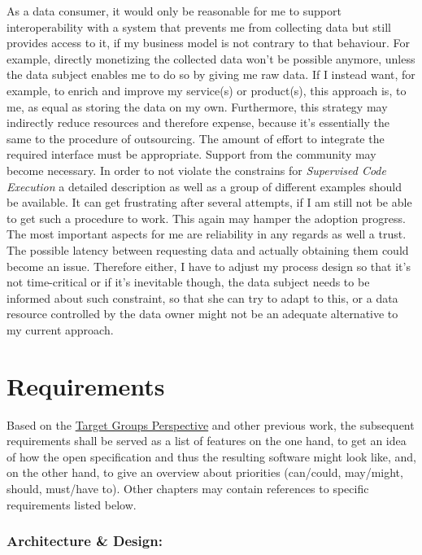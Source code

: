 \documentclass[12pt,english,a4paper,titlepage,cleardoublepage=empty,dottedtoc]{report}
\begin{document}
As a data consumer, it would only be reasonable for me to support
interoperability with a system that prevents me from collecting data but
still provides access to it, if my business model is not contrary to
that behaviour. For example, directly monetizing the collected data
won't be possible anymore, unless the data subject enables me to do so
by giving me raw data. If I instead want, for example, to enrich and
improve my service(s) or product(s), this approach is, to me, as equal
as storing the data on my own. Furthermore, this strategy may indirectly
reduce resources and therefore expense, because it's essentially the
same to the procedure of outsourcing. The amount of effort to integrate
the required interface must be appropriate. Support from the community
may become necessary. In order to not violate the constrains for
\emph{Supervised Code Execution} a detailed description as well as a
group of different examples should be available. It can get frustrating
after several attempts, if I am still not be able to get such a
procedure to work. This again may hamper the adoption progress. The most
important aspects for me are reliability in any regards as well a trust.
The possible latency between requesting data and actually obtaining them
could become an issue. Therefore either, I have to adjust my process
design so that it's not time-critical or if it's inevitable though, the
data subject needs to be informed about such constraint, so that she can
try to adapt to this, or a data resource controlled by the data owner
might not be an adequate alternative to my current approach.

\hypertarget{requirements}{\section{Requirements}\label{requirements}}

Based on the \protect\hyperlink{target-groups-perspective}{Target Groups
Perspective} and other previous work, the subsequent requirements shall
be served as a list of features on the one hand, to get an idea of how
the open specification and thus the resulting software might look like,
and, on the other hand, to give an overview about priorities (can/could,
may/might, should, must/have to). Other chapters may contain references
to specific requirements listed below.

\subsubsection*{Architecture \& Design:}\label{architecture-design}
\end{document}
